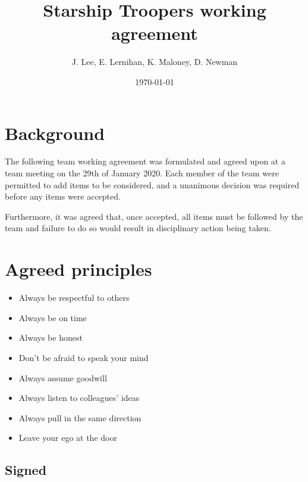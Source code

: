 \documentclass[12pt,a4paper]{article}
\title{Starship Troopers working agreement}
\author{J. Lee, E. Lernihan, K. Maloney, D. Newman}
\date{\today}
\begin{document}
\maketitle

\section*{Background}
The following team working agreement was formulated and agreed upon
at a team meeting on the 29th of January 2020. Each member of the team
were permitted to add items to be considered, and a unanimous decision
was required before any items were accepted.

Furthermore, it was agreed that, once accepted, all items must be followed
by the team and failure to do so would result in disciplinary action being
taken.

\newpage

\section*{Agreed principles}
\begin{itemize}
\item Always be respectful to others
\item Always be on time
\item Always be honest
\item Don't be afraid to speak your mind
\item Always assume goodwill
\item Always listen to colleagues' ideas
\item Always pull in the same direction
\item Leave your ego at the door
\end{itemize}
\vfill
\subsection*{Signed}
\hline
\end{document}
